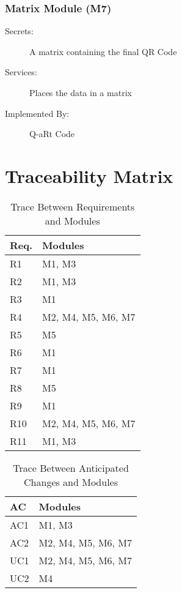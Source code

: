 \documentclass[12pt, titlepage]{article}
\begin{document}
\subsubsection{Matrix Module (M7)}

\begin{description}
\item[Secrets:] A matrix containing the final QR Code
\item[Services:] Places the data in a matrix
\item[Implemented By:] Q-aRt Code
\end{description}

\section{Traceability Matrix} \label{SecTM}


\begin{table}[H]
\centering
\begin{tabular}{p{} p{}}
\toprule
\textbf{Req.} & \textbf{Modules}\\
\midrule
R1 & M1, M3\\
R2 & M1, M3\\
R3 & M1\\
R4 & M2, M4, M5, M6, M7\\
R5 & M5\\
R6 & M1\\
R7 & M1\\
R8 & M5\\
R9 & M1\\
R10 & M2, M4, M5, M6, M7\\
R11 & M1, M3\\
\bottomrule
\end{tabular}
\caption{Trace Between Requirements and Modules}
\label{TblRT}
\end{table}

\begin{table}[H]
\centering
\begin{tabular}{p{} p{}}
\toprule
\textbf{AC} & \textbf{Modules}\\
\midrule
AC1 & M1, M3\\
AC2 & M2, M4, M5, M6, M7\\
UC1 & M2, M4, M5, M6, M7\\
UC2 & M4\\
\bottomrule
\end{tabular}
\caption{Trace Between Anticipated Changes and Modules}
\label{TblACT}
\end{table}
\end{document}
